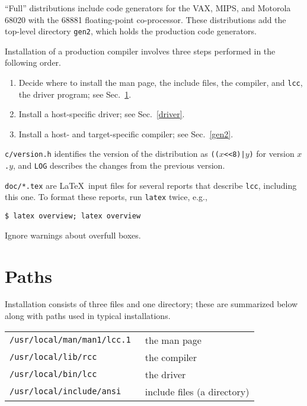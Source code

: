 ``Full'' distributions include code generators for the VAX, MIPS,
and Motorola 68020 with the 68881 floating-point co-processor.
These distributions add the top-level directory
\verb|gen2|, which holds the production code generators.

Installation of a production compiler
involves three steps performed in the following order.
\begin{enumerate}
\item Decide where to install the man page, the include files,
the compiler, and \verb|lcc|, the driver program; see Sec.~\ref{paths}.

\item Install a host-specific driver; see Sec.~\ref{driver}.

\item Install a host- and target-specific compiler; see Sec.~\ref{gen2}.
\end{enumerate}

\verb|c/version.h| identifies the version of the distribution
as {\tt (($x$<<8)|$y$)} for version {\tt $x$.$y$},
and \verb|LOG| describes the changes from the previous version.

\verb|doc/*.tex| are \LaTeX\ input files for several reports that
describe \verb|lcc|, including this one.
To format these reports, run \verb|latex| twice, e.g.,
\begin{verbatim}
$ latex overview; latex overview
\end{verbatim}
Ignore warnings about overfull boxes.

\section{Paths}\label{paths}

Installation consists of three files and one directory;
these are summarized below along with paths used in typical installations.

\begin{center}
\begin{tabular}{ll}
\tt /usr/local/man/man1/lcc.1	& the man page \\
\tt /usr/local/lib/rcc		& the compiler \\
\tt /usr/local/bin/lcc		& the driver \\
\tt /usr/local/include/ansi	& include files (a directory) \\
\end{tabular}
\end{center}


